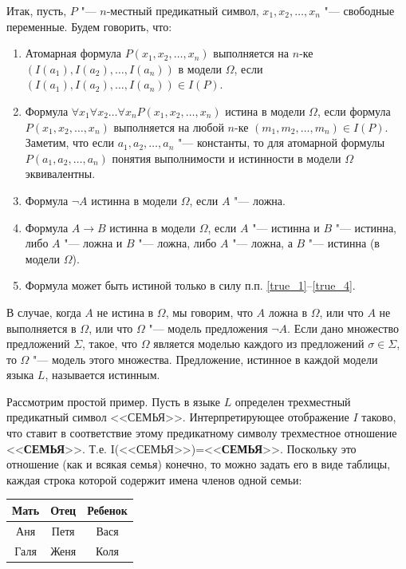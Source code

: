 \documentclass[b5paper,11pt]{book}
\numberwithin{Def}{section}
\numberwithin{Th}{chapter}
\numberwithin{St}{chapter}
\begin{document}
	Итак, пусть, $P$ "--- $n$-местный предикатный символ, $x_1,x_2,\dots,x_n$ "--- свободные переменные. Будем говорить, что:
	\begin{enumerate}
		\item\label{true_1} Атомарная формула  $P(x_1,x_2,\dots,x_n)$ выполняется на $n$-ке $(I(a_1), I(a_2),\dots, I(a_n))$ в  модели $\Omega$, если $(I(a_1),I(a_2),\dots,I(a_n))\in I(P)$.
		\item Формула $\forall x_1 \forall x_2 \dots \forall x_n P(x_1,x_2,\dots,x_n)$ истина в модели $\Omega$, если формула $P(x_1,x_2,\dots,x_n)$ выполняется на любой $n$-ке $(m_1,m_2,\dots,m_n)\in I(P)$. Заметим, что если $a_1,a_2,\dots,a_n$ "--- константы, то для атомарной формулы $P(a_1,a_2,\dots,a_n)$ понятия выполнимости и истинности в модели $\Omega$ эквивалентны.
		\item Формула $\neg A$ истинна в модели $\Omega$, если $A$ "--- ложна.
		\item\label{true_4} Формула $A\rightarrow B$ истинна в модели $\Omega$, если $A$ "--- истинна и $B$ "--- истинна, либо $A$ "--- ложна и $B$ "--- ложна, либо $A$ "--- ложна, а $B$ "--- истинна (в модели $\Omega$).
		\item Формула может быть истиной только в силу п.п. \ref{true_1}--\ref{true_4}.
	\end{enumerate}
	
	В случае, когда $A$ не истина в $\Omega$, мы говорим, что $A$ ложна в $\Omega$, или что $A$ не выполняется в $\Omega$, или что $\Omega$ "--- модель предложения $\neg A$. Если дано множество предложений $\Sigma$, такое, что $\Omega$ является моделью каждого из предложений $\sigma\in\Sigma$, то $\Omega$ "--- модель этого множества. Предложение, истинное в каждой модели языка $L$, называется истинным.
	
	Рассмотрим простой пример. Пусть в языке $L$ определен трехместный предикатный символ <<СЕМЬЯ>>. Интерпретирующее отображение $I$ таково, что ставит в соответствие этому предикатному символу трехместное отношение <<\textbf{СЕМЬЯ}>>. Т.е. I(<<СЕМЬЯ>>)=<<\textbf{СЕМЬЯ}>>. Поскольку это отношение (как и всякая семья) конечно, то можно задать его в виде таблицы, каждая строка которой содержит имена членов одной семьи:
	
	\begin{table}[H]
		\centering
		\begin{tabular}{|c|c|c|}
			\hline
			\textbf{Мать} & \textbf{Отец} & \textbf{Ребенок}\\
			\hline
			Аня & Петя & Вася\\
			\hline
			Галя& Женя & Коля\\
			\hline
		\end{tabular}
	\end{table}
	
\end{document}

